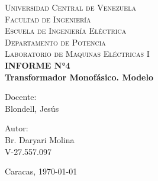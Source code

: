 \begin{titlepage}
    \begin{center}
        \textsc{ Universidad Central de Venezuela}\\
        \textsc{ Facultad de Ingeniería}\\
        \textsc{ Escuela de Ingeniería Eléctrica}\\
        \textsc{ Departamento de Potencia}\\
        \textsc{ Laboratorio de Maquinas Eléctricas I}\\[7cm]
        
        {\Large \bfseries INFORME N°4}\\[0.2cm]
        {\Large \bfseries Transformador Monofásico. Modelo}\\[9cm]
        
        \begin{minipage}{0.4\textwidth}
            \begin{flushleft}
                {Docente:}\\
                Blondell, Jesús 
            \end{flushleft}
        \end{minipage}
        \begin{minipage}{0.4\textwidth}
            \begin{flushright}
                {Autor:}\\
                Br. Daryari Molina\\
                V-27.557.097
            \end{flushright}
        \end{minipage}
        
        \vfill
        
        { Caracas, \today} %
    \end{center}
\end{titlepage}